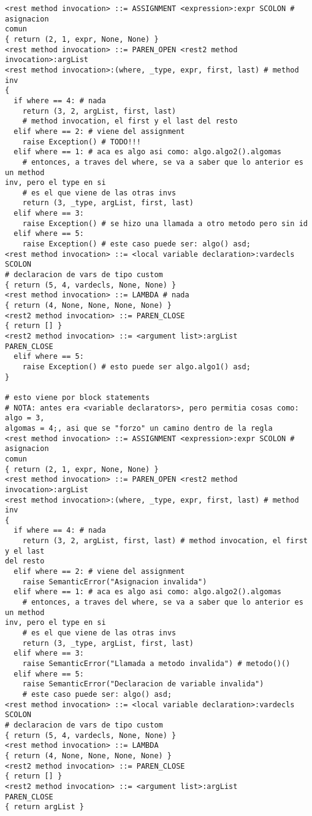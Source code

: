 \documentclass [a4paper,abstracton,titlepage]{scrartcl}
\begin{document}
\begin{lstlisting}
<rest method invocation> ::= ASSIGNMENT <expression>:expr SCOLON # asignacion
comun
{ return (2, 1, expr, None, None) }
<rest method invocation> ::= PAREN_OPEN <rest2 method invocation>:argList
<rest method invocation>:(where, _type, expr, first, last) # method inv
{
  if where == 4: # nada
    return (3, 2, argList, first, last) 
    # method invocation, el first y el last del resto
  elif where == 2: # viene del assignment
    raise Exception() # TODO!!!
  elif where == 1: # aca es algo asi como: algo.algo2().algomas
    # entonces, a traves del where, se va a saber que lo anterior es un method
inv, pero el type en si
    # es el que viene de las otras invs
    return (3, _type, argList, first, last)
  elif where == 3:
    raise Exception() # se hizo una llamada a otro metodo pero sin id
  elif where == 5:
    raise Exception() # este caso puede ser: algo() asd;
<rest method invocation> ::= <local variable declaration>:vardecls SCOLON
# declaracion de vars de tipo custom
{ return (5, 4, vardecls, None, None) }
<rest method invocation> ::= LAMBDA # nada
{ return (4, None, None, None, None) }
<rest2 method invocation> ::= PAREN_CLOSE
{ return [] }
<rest2 method invocation> ::= <argument list>:argList
PAREN_CLOSE
  elif where == 5:
    raise Exception() # esto puede ser algo.algo1() asd;
}

# esto viene por block statements
# NOTA: antes era <variable declarators>, pero permitia cosas como: algo = 3,
algomas = 4;, asi que se "forzo" un camino dentro de la regla
<rest method invocation> ::= ASSIGNMENT <expression>:expr SCOLON # asignacion
comun
{ return (2, 1, expr, None, None) }
<rest method invocation> ::= PAREN_OPEN <rest2 method invocation>:argList
<rest method invocation>:(where, _type, expr, first, last) # method inv
{
  if where == 4: # nada
    return (3, 2, argList, first, last) # method invocation, el first y el last
del resto
  elif where == 2: # viene del assignment
    raise SemanticError("Asignacion invalida")
  elif where == 1: # aca es algo asi como: algo.algo2().algomas
    # entonces, a traves del where, se va a saber que lo anterior es un method
inv, pero el type en si
    # es el que viene de las otras invs
    return (3, _type, argList, first, last)
  elif where == 3:
    raise SemanticError("Llamada a metodo invalida") # metodo()()
  elif where == 5:
    raise SemanticError("Declaracion de variable invalida") 
    # este caso puede ser: algo() asd;
<rest method invocation> ::= <local variable declaration>:vardecls SCOLON
# declaracion de vars de tipo custom
{ return (5, 4, vardecls, None, None) }
<rest method invocation> ::= LAMBDA
{ return (4, None, None, None, None) }
<rest2 method invocation> ::= PAREN_CLOSE
{ return [] }
<rest2 method invocation> ::= <argument list>:argList
PAREN_CLOSE
{ return argList }
    \end{lstlisting}
\end{document}
